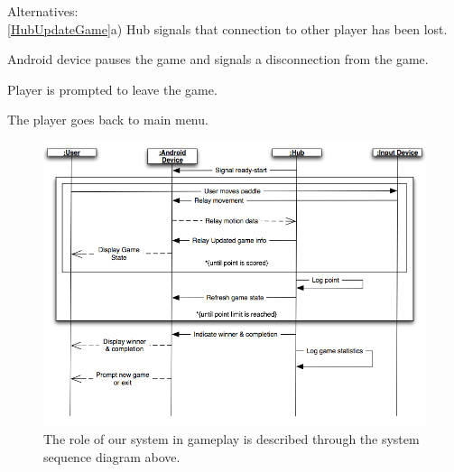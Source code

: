 \documentclass[12pt]{article}
\newenvironment{enumerate*}%
  {\begin{enumerate}%
  	\setlength{\parsep}{0pt}
    \setlength{\itemsep}{0pt}%
    \setlength{\parskip}{0pt}}%
  {\end{enumerate}}
\begin{document}
Alternatives:\\
\ref{HubUpdateGame}a) Hub signals that connection to other player has 
  been lost.
\begin{enumerate*}
\item Android device pauses the game and signals a disconnection from the game.
\item Player is prompted to leave the game.
\item The player goes back to main menu.
\end{enumerate*}

\begin{figure}
\begin{center}
\includegraphics[scale=.5]{ssd_GamePlay_1.png}
\caption{\label{ssd_GamePlay_1}The role of our system in gameplay is 
  described through the system sequence diagram above.}
\end{center}
\end{figure}
\end{document}
